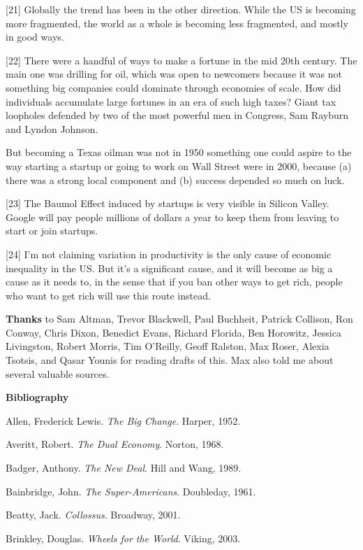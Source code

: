 [21]
Globally the trend has been in the other direction.  While
the US is becoming more fragmented, the world as a whole is becoming
less fragmented, and mostly in good ways.

[22]
There were a handful of ways to make a fortune in the mid
20th century.  The main one was drilling for oil, which was open
to newcomers because it was not something big companies could
dominate through economies of scale.  How did individuals accumulate
large fortunes in an era of such high taxes?  Giant tax loopholes
defended by two of the most powerful men in Congress, Sam Rayburn
and Lyndon Johnson.

But becoming a Texas oilman was not in 1950 something one could
aspire to the way starting a startup or going to work on Wall Street
were in 2000, because (a) there was a strong local component and
(b) success depended so much on luck.

[23]
The Baumol Effect induced by startups is very visible in
Silicon Valley.  Google will pay people millions of dollars a year
to keep them from leaving to start or join startups.

[24]
I'm not claiming variation in productivity is the only cause
of economic inequality in the US. But it's a significant cause, and
it will become as big a cause as it needs to, in the sense that if
you ban other ways to get rich, people who want to get rich will
use this route instead.



\textbf{Thanks} to Sam Altman, Trevor Blackwell, Paul Buchheit, Patrick
Collison, Ron Conway, Chris Dixon, Benedict Evans, Richard Florida,
Ben Horowitz, Jessica Livingston, Robert Morris, Tim O'Reilly, Geoff
Ralston, Max Roser, Alexia Tsotsis, and Qasar Younis for reading
drafts of this.  Max also told me about several valuable sources.



\textbf{Bibliography}

Allen, Frederick Lewis. \emph{The Big Change}. Harper, 1952.

Averitt, Robert. \emph{The Dual Economy}. Norton, 1968.

Badger, Anthony. \emph{The New Deal}. Hill and Wang, 1989.

Bainbridge, John. \emph{The Super-Americans}. Doubleday, 1961.

Beatty, Jack. \emph{Collossus}. Broadway, 2001.

Brinkley, Douglas. \emph{Wheels for the World}. Viking, 2003.

